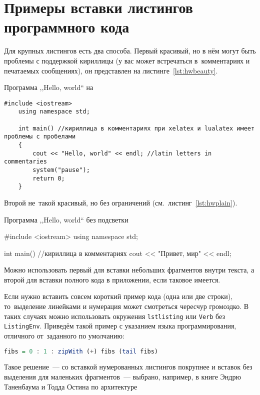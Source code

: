 \chapter{Примеры вставки листингов программного кода}\label{app:A}

Для крупных листингов есть два способа. Первый красивый, но в нём могут быть
проблемы с поддержкой кириллицы (у вас может встречаться в~комментариях
и печатаемых сообщениях), он представлен на листинге~\ref{lst:hwbeauty}.
\begin{ListingEnv}[!h]%
    \captiondelim{ } %
    \caption{Программа ,,Hello, world`` на \protect\cpp}\label{lst:hwbeauty}
    \begin{lstlisting}[language={[ISO]C++}]
	#include <iostream>
	using namespace std;

	int main() //кириллица в комментариях при xelatex и lualatex имеет проблемы с пробелами
	{
		cout << "Hello, world" << endl; //latin letters in commentaries
		system("pause");
		return 0;
	}
    \end{lstlisting}
\end{ListingEnv}%
Второй не~такой красивый, но без ограничений (см.~листинг~\ref{lst:hwplain}).
\begin{ListingEnv}[!h]
    \captiondelim{ } %
    \caption{Программа ,,Hello, world`` без подсветки}\label{lst:hwplain}
    \begin{Verb}

        #include <iostream>
        using namespace std;

        int main() //кириллица в комментариях
        {
            cout << "Привет, мир" << endl;
        }
    \end{Verb}
\end{ListingEnv}

Можно использовать первый для вставки небольших фрагментов
внутри текста, а второй для вставки полного
кода в приложении, если таковое имеется.

Если нужно вставить совсем короткий пример кода (одна или две строки),
то~выделение  линейками и нумерация может смотреться чересчур громоздко.
В таких случаях можно использовать окружения \texttt{lstlisting} или
\texttt{Verb} без \texttt{ListingEnv}. Приведём такой пример
с указанием языка программирования, отличного от~заданного по умолчанию:
\begin{lstlisting}[language=Haskell]
fibs = 0 : 1 : zipWith (+) fibs (tail fibs)
\end{lstlisting}
Такое решение~--- со вставкой нумерованных листингов покрупнее
и вставок без выделения для маленьких фрагментов~--- выбрано,
например, в книге Эндрю Таненбаума и Тодда Остина по архитектуре

